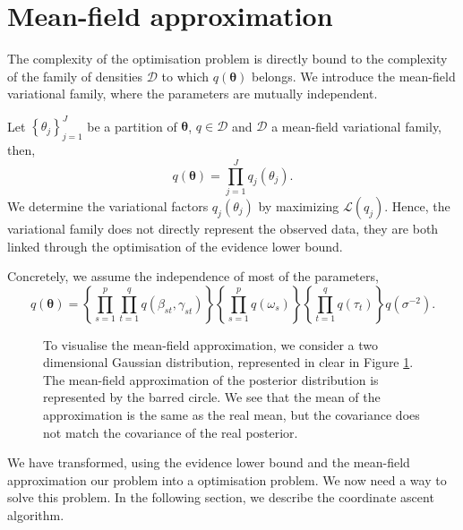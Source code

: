\documentclass[a4paper, 11pt]{report}
\numberwithin{equation}{chapter}
\begin{document}
\section{Mean-field approximation}
The complexity of the optimisation problem is directly bound to the complexity of the family of densities $\mathcal{D}$ to which $q(\boldsymbol{\theta})$ belongs. We introduce the mean-field variational family, where the parameters are mutually independent.

Let $\left\lbrace \theta_j\right\rbrace_{j=1}^J$ be a partition of $\boldsymbol{\theta}$, $q \in \mathcal{D}$ and $\mathcal{D}$ a mean-field variational family, then,
\begin{equation*}
q(\boldsymbol{\theta}) = \prod_{j=1}^J q_j(\theta_j).
\end{equation*}
We determine the variational factors $q_j(\theta_j)$ by maximizing $\mathcal{L}(q_j)$. Hence, the variational family does not directly represent the observed data, they are both linked through the optimisation of the evidence lower bound.

Concretely, we assume the independence of most of the parameters,
\begin{equation*}
q(\boldsymbol{\theta}) =\left\lbrace\prod_{s=1}^p \prod_{t=1}^q q(\beta_{st}, \gamma_{st})\right\rbrace \left\lbrace\prod_{s=1}^p  q(\omega_s)\right\rbrace \left\lbrace\prod_{t=1}^q q(\tau_t)\right\rbrace q(\sigma^{-2}).
\end{equation*}


\begin{figure}[h!]
\centering
{}
\caption{\label{fig:mean_field}To visualise the mean-field approximation, we consider a two dimensional Gaussian distribution, represented in clear in Figure \ref{fig:mean_field}. The mean-field approximation of the posterior distribution is represented by the barred circle. We see that the mean of the approximation is the same as the real mean, but the covariance does not match the covariance of the real posterior.}
\end{figure}

We have transformed, using the evidence lower bound and the mean-field approximation our problem into a optimisation problem. We now need a way to solve this problem. In the following section, we describe the coordinate ascent algorithm.
\end{document}
